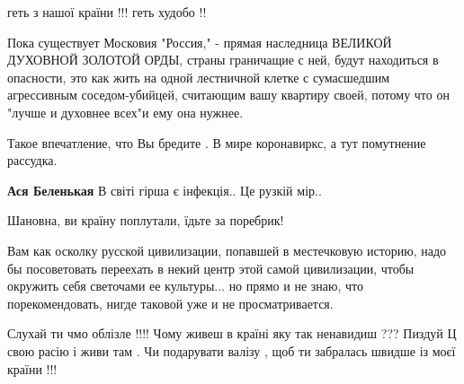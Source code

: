 геть з нашої країни !!! геть худобо !!



Пока существует Московия "Россия," - прямая наследница ВЕЛИКОЙ ДУХОВНОЙ ЗОЛОТОЙ
ОРДЫ, страны граничащие с ней, будут находиться в опасности, это как жить на
одной лестничной клетке с сумасшедшим агрессивным соседом-убийцей, считающим
вашу квартиру своей, потому что он "лучше и духовнее всех"и ему она нужнее.

\begin{itemize}

Такое впечатление, что Вы бредите . В мире коронавиркс, а тут помутнение рассудка.


\textbf{Ася Беленькая} В світі гірша є інфекція.. Це рузкій мір..
\end{itemize}


Шановна, ви країну поплутали, їдьте за поребрик!


Вам как осколку русской цивилизации, попавшей в местечковую историю, надо бы посоветовать переехать в некий центр этой самой цивилизации, чтобы окружить себя светочами ее культуры... но прямо и не знаю, что порекомендовать, нигде таковой уже и не просматривается.


Слухай ти чмо облізле !!!! Чому живеш в країні яку так ненавидиш ??? Пиздуй Ц свою расію і живи там . Чи подарувати валізу , щоб ти забралась швидше із моєї країни !!!



